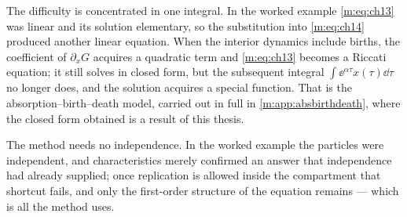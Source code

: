 The difficulty is concentrated in one integral. In the worked example
\cref{m:eq:ch13} was linear and its solution elementary, so the substitution into
\cref{m:eq:ch14} produced another linear equation. When the interior dynamics
include births, the coefficient of $\partial_xG$ acquires a quadratic term and
\cref{m:eq:ch13} becomes a Riccati equation; it still solves in closed form, but the
subsequent integral $\int\ee^{\alpha\tau}x(\tau)\dd\tau$ no longer does, and the
solution acquires a special function. That is the absorption--birth--death model,
carried out in full in \cref{m:app:absbirthdeath}, where the closed form obtained is
a result of this thesis.

The method needs no independence. In the worked example the particles were
independent, and characteristics merely confirmed an answer that independence had
already supplied; once replication is allowed inside the compartment that shortcut
fails, and only the first-order structure of the equation remains --- which is all
the method uses.

\FloatBarrier
